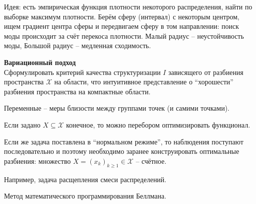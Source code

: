 \documentclass[a4paper]{article}
\newcommand{\brac}[1]{{\left ( #1 \right )}}
\begin{document}
Идея: есть эмпирическая функция плотности некоторого распределения, найти по выборке максимум плотности.
Берём сферу (интервал) с некоторым центром, ищем градиент центра сферы и передвигаем сферу в том направлении:
поиск моды происходит за счёт перекоса плотности.
Малый радиус -- неустойчивость моды, Большой радиус -- медленная сходимость.

\textbf{Вариационный подход}\hfill\\
Сформулировать критерий качества структуризации $I$ зависящего от разбиения пространства $\mathcal{X}$
на области, что интуитивное представление о ``хорошести'' разбиения пространства на компактные области.

Переменные -- меры близости между группами точек (и самими точками).

Если задано $X\subseteq \mathcal{X}$ конечное, то можно перебором оптимизировать функционал.

Если же задача поставлена в ``нормальном режиме'', то наблюдения поступают последовательно и поэтому необходимо заранее конструировать оптимальные разбиения:
множество $X = \brac{x_k}_{k\geq 1}\in \mathcal{X}$ -- счётное.

Например, задача расщепления смеси распределений.

Метод математического программирования Беллмана.
\end{document}
